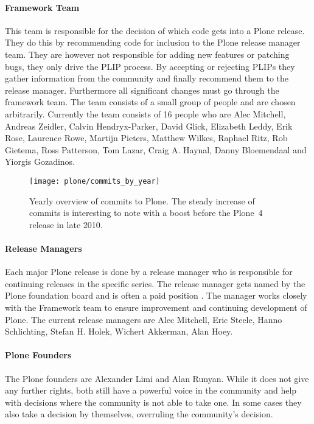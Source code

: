 \paragraph{Framework Team}

This team is responsible for the decision of which code gets into a Plone
release. They do this by recommending code for inclusion to the Plone release
manager team. They are however not responsible for adding new features or
patching bugs, they only drive the \ac{PLIP} process. By accepting or rejecting
\acp{PLIP} they gather information from the community and finally recommend
them to the release manager. Furthermore all significant changes must go
through the framework team. The team consists of a small group of people and
are chosen arbitrarily. Currently the team consists of 16 people who are Alec
Mitchell, Andreas Zeidler, Calvin Hendryx-Parker, David Glick, Elizabeth Leddy,
Erik Rose, Laurence Rowe, Martijn Pieters, Matthew Wilkes, Raphael Ritz, Rob
Gietema, Ross Patterson, Tom Lazar, Craig A. Haynal, Danny Bloemendaal and
Yiorgis Gozadinos.

\begin{figure}[thbp]
  \centering
  \texttt{[image: plone/commits\_by\_year]}
  \caption[Commits by Year, Plone]
  {Yearly overview of commits to Plone. The steady increase of commits is
    interesting to note with a boost before the Plone~4 release in late 2010.}
  \label{fig:plone:cby}
\end{figure}

\paragraph{Release Managers}

Each major Plone release is done by a release manager who is responsible for
continuing releases in the specific series. The release manager gets named by
the Plone foundation board and is often a paid position
\cite{PlonePaidReleaseManager}. The manager works closely with the Framework
team to ensure improvement and continuing development of Plone. The current
release managers are Alec Mitchell, Eric Steele, Hanno Schlichting, Stefan H.
Holek, Wichert Akkerman, Alan Hoey.

\paragraph{Plone Founders}

The Plone founders are Alexander Limi and Alan Runyan. While it does not give
any further rights, both still have a powerful voice in the community and help
with decisions where the community is not able to take one. In some cases they
also take a decision by themselves, overruling the community's decision.

